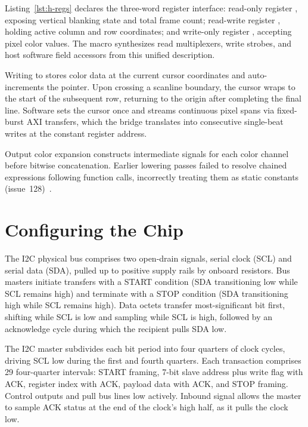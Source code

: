\documentclass[journal,9pt]{IEEEtran}
\newcommand{\hdmipart}[3]{%
}
\begin{document}
Listing~\ref{lst:h-regs} declares the three-word register interface:
read-only register , exposing vertical blanking state and
total frame count; read-write register , holding active column
and row coordinates; and write-only register , accepting pixel
color values. The  macro synthesizes read multiplexers, write
strobes, and host software field accessors from this unified description.

\hdmipart{regs}{The video peripheral's words.}{lst:h-regs}

Writing to  stores color data at the current cursor coordinates
and auto-increments the pointer. Upon crossing a scanline boundary, the
cursor wraps to the start of the subsequent row, returning to the origin
after completing the final line. Software sets the cursor once and streams
continuous pixel spans via fixed-burst AXI transfers, which the bridge
translates into consecutive single-beat writes at the constant register
address.

\hdmipart{state}{The video peripheral's state.}{lst:h-state}

\hdmipart{run}{The video peripheral's step.}{lst:h-run}

Output color expansion constructs intermediate signals for each color
channel before bitwise concatenation. Earlier lowering passes failed to
resolve chained expressions following function calls, incorrectly treating
them as static constants (issue~128)~\cite{i128}.

\section{Configuring the Chip}
\label{sec:h-i2c}

The I2C physical bus comprises two open-drain signals, serial clock (SCL)
and serial data (SDA), pulled up to positive supply rails by onboard
resistors. Bus masters initiate transfers with a START condition (SDA
transitioning low while SCL remains high) and terminate with a STOP
condition (SDA transitioning high while SCL remains high). Data octets
transfer most-significant bit first, shifting while SCL is low and
sampling while SCL is high, followed by an acknowledge cycle during which
the recipient pulls SDA low.

The I2C master subdivides each bit period into four quarters of 
clock cycles, driving SCL low during the first and fourth quarters. Each
transaction comprises 29 four-quarter intervals: START framing, 7-bit slave
address plus write flag with ACK, register index with ACK, payload data with
ACK, and STOP framing. Control outputs  and 
pull bus lines low actively. Inbound signal  allows the master
to sample ACK status at the end of the clock's high half, as it pulls the
clock low.
\end{document}
